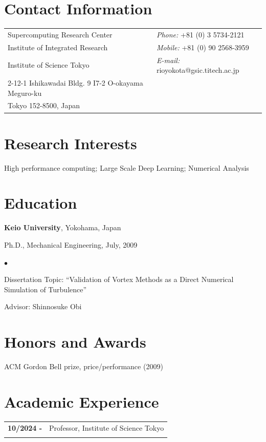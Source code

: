 \documentclass[margin,line]{cv}
\newenvironment{list1}{
  \begin{list}{\ding{113}}{%
      \setlength{\itemsep}{0in}
      \setlength{\parsep}{0in} \setlength{\parskip}{0in}
      \setlength{\topsep}{0in} \setlength{\partopsep}{0in} 
      \setlength{\leftmargin}{0.17in}}}{\end{list}}
\newenvironment{list2}{
  \begin{list}{$\bullet$}{%
      \setlength{\itemsep}{0in}
      \setlength{\parsep}{0in} \setlength{\parskip}{0in}
      \setlength{\topsep}{0in} \setlength{\partopsep}{0in} 
      \setlength{\leftmargin}{0.2in}}}{\end{list}}
\begin{document}

\begin{resume}
\section{\sc Contact Information}
\vspace{.05in}
\begin{tabular}{@{}p{3.8in}p{4in}}
Supercomputing Research Center  & {\it Phone:}  +81 (0) 3 5734-2121\\
Institute of Integrated Research & {\it Mobile:} +81 (0) 90 2568-3959\\ 
Institute of Science Tokyo & {\it E-mail:} rioyokota@gsic.titech.ac.jp \\
2-12-1 Ishikawadai Bldg. 9 I7-2 O-okayama Meguro-ku \\
Tokyo 152-8500, Japan
\end{tabular}


\section{\sc Research Interests}
High performance computing; Large Scale Deep Learning; Numerical Analysis

\section{\sc Education}
{\bf Keio University}, Yokohama, Japan\\
\vspace*{-.1in}
\begin{list1}
\item[] Ph.D., Mechanical Engineering, July, 2009
\begin{list2}
\vspace*{.05in}
\item Dissertation Topic:  ``Validation of Vortex Methods as a Direct Numerical Simulation of Turbulence'' 
\item Advisor:  Shinnosuke Obi
\end{list2}
\end{list1}

\section{\sc Honors and Awards} 
ACM Gordon Bell prize, price/performance (2009)

\section{\sc Academic Experience}
\begin{tabular}{ll}
{\bf 10/2024 - } & Professor, Institute of Science Tokyo\\ \\


\end{tabular}
\end{resume}
\end{document}
